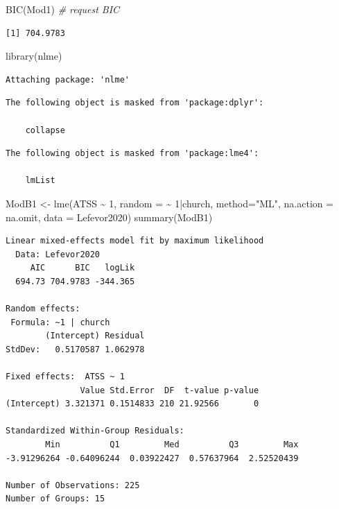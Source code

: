 \documentclass[
  english,
]{book}
\newenvironment{Shaded}{\begin{snugshade}}{\end{snugshade}}
\newcommand{\AttributeTok}[1]{\textcolor[rgb]{0.77,0.63,0.00}{#1}}
\newcommand{\CommentTok}[1]{\textcolor[rgb]{0.56,0.35,0.01}{\textit{#1}}}
\newcommand{\DecValTok}[1]{\textcolor[rgb]{0.00,0.00,0.81}{#1}}
\newcommand{\FunctionTok}[1]{\textcolor[rgb]{0.00,0.00,0.00}{#1}}
\newcommand{\NormalTok}[1]{#1}
\newcommand{\OtherTok}[1]{\textcolor[rgb]{0.56,0.35,0.01}{#1}}
\newcommand{\SpecialCharTok}[1]{\textcolor[rgb]{0.00,0.00,0.00}{#1}}
\newcommand{\StringTok}[1]{\textcolor[rgb]{0.31,0.60,0.02}{#1}}
\begin{document}
\begin{Shaded}
\begin{Highlighting}[]
\FunctionTok{BIC}\NormalTok{(Mod1) }\CommentTok{\# request BIC}
\end{Highlighting}
\end{Shaded}

\begin{verbatim}
[1] 704.9783
\end{verbatim}

\begin{Shaded}
\begin{Highlighting}[]
\FunctionTok{library}\NormalTok{(nlme)}
\end{Highlighting}
\end{Shaded}

\begin{verbatim}
Attaching package: 'nlme'
\end{verbatim}

\begin{verbatim}
The following object is masked from 'package:dplyr':

    collapse
\end{verbatim}

\begin{verbatim}
The following object is masked from 'package:lme4':

    lmList
\end{verbatim}

\begin{Shaded}
\begin{Highlighting}[]
\NormalTok{ModB1 }\OtherTok{\textless{}{-}} \FunctionTok{lme}\NormalTok{(ATSS }\SpecialCharTok{\textasciitilde{}} \DecValTok{1}\NormalTok{, }\AttributeTok{random =} \SpecialCharTok{\textasciitilde{}} \DecValTok{1}\SpecialCharTok{|}\NormalTok{church, }\AttributeTok{method=}\StringTok{"ML"}\NormalTok{, }\AttributeTok{na.action =}\NormalTok{ na.omit, }\AttributeTok{data =}\NormalTok{ Lefevor2020)}
\FunctionTok{summary}\NormalTok{(ModB1)}
\end{Highlighting}
\end{Shaded}

\begin{verbatim}
Linear mixed-effects model fit by maximum likelihood
  Data: Lefevor2020 
     AIC      BIC   logLik
  694.73 704.9783 -344.365

Random effects:
 Formula: ~1 | church
        (Intercept) Residual
StdDev:   0.5170587 1.062978

Fixed effects:  ATSS ~ 1 
               Value Std.Error  DF  t-value p-value
(Intercept) 3.321371 0.1514833 210 21.92566       0

Standardized Within-Group Residuals:
        Min          Q1         Med          Q3         Max 
-3.91296264 -0.64096244  0.03922427  0.57637964  2.52520439 

Number of Observations: 225
Number of Groups: 15 
\end{verbatim}
\end{document}
